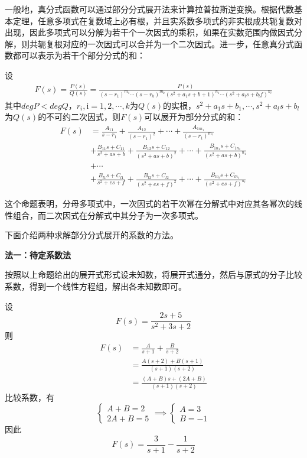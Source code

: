 \documentclass{ctexbook}
\begin{document}
一般地，真分式函数可以通过部分分式展开法来计算拉普拉斯逆变换。根据代数基本定理，任意多项式在复数域上必有根，并且实系数多项式的非实根成共轭复数对出现，因此多项式可以分解为若干个一次因式的乘积，如果在实数范围内做因式分解，则共轭复根对应的一次因式可以合并为一个二次因式。进一步，任意真分式函数都可以表示为若干个部分分式的和\cite{zorich}\cite{xinjiang}：
\begin{theorem}[部分分式展开定理]
    设\begin{align*}
    F(s)=\frac{P(s)}{Q(s)}=\frac{P(s)}{(s-r_1)^{m_1}\cdots (s-r_k)^{m_k}(s^2+a_1 s+b+1)^{n_1}\cdots (s^2+a_l s+b_l f)^{n_l}}
    \end{align*}
其中$degP<degQ$，$r_i,\mathrm{i}=1,2,\cdots,k$为$Q(s)$的实根，$s^2+a_1 s+b_1,\cdots,s^2+a_l s+b_l$为$Q(s)$的不可约二次因式，则$F(s)$可以展开为部分分式的和：
\begin{align*}
    F(s)&=\frac{A_{11}}{s-r_1}+\frac{A_{12}}{(s-r_1)^2}+\cdots +\frac{A_{1m_1}}{(s-r_1)^{m_1}}\\
    &+\frac{B_{11}s+C_{11}}{s^2+as+b}+\frac{B_{12}s+C_{12}}{(s^2+as+b)^2}+\cdots +\frac{B_{1n_1}s+C_{1n_1}}{(s^2+as+b)^{n_1}}\\
    &+\cdots \\
    &+\frac{B_{l1}s+C_{l1}}{s^2+es+f}+\frac{B_{l2}s+C_{l2}}{(s^2+es+f)^2}+\cdots +\frac{B_{ln_l}s+C_{ln_l}}{(s^2+es+f)^{n_l}}
\end{align*}
\end{theorem}
这个命题表明，分母多项式中，一次因式的若干次幂在分解式中对应其各幂次的线性组合，而二次因式在分解式中其分子为一次多项式。

下面介绍两种求解部分分式展开的系数的方法。

\noindent \textbf{法一：待定系数法}

按照以上命题给出的展开式形式设未知数，将展开式通分，然后与原式的分子比较系数，得到一个线性方程组，解出各未知数即可。
\begin{example}
    设\[F(s)=\frac{2s+5}{s^2+3s+2}\]
    则
    \begin{align*}
        F(s)&=\frac{A}{s+1}+\frac{B}{s+2}\\
        &=\frac{A(s+2)+B(s+1)}{(s+1)(s+2)}\\
        &=\frac{(A+B)s+(2A+B)}{(s+1)(s+2)}
    \end{align*}
    比较系数，有
    \[\begin{cases}
        A+B=2\\
        2A+B=5
    \end{cases}\implies \begin{cases}
        A=3\\
        B=-1
    \end{cases}\]
    因此\[F(s)=\frac{3}{s+1}-\frac{1}{s+2}\]
\end{example}
\end{document}
